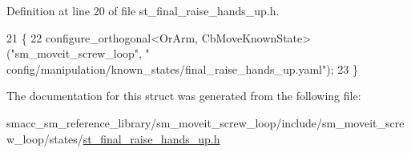 Definition at line 20 of file st\+\_\+final\+\_\+raise\+\_\+hands\+\_\+up.\+h.


\begin{DoxyCode}
21     \{
22         configure\_orthogonal<OrArm, CbMoveKnownState>(\textcolor{stringliteral}{"sm\_moveit\_screw\_loop"}, \textcolor{stringliteral}{"
      config/manipulation/known\_states/final\_raise\_hands\_up.yaml"});
23     \}
\end{DoxyCode}


The documentation for this struct was generated from the following file\+:\begin{DoxyCompactItemize}
\item 
smacc\+\_\+sm\+\_\+reference\+\_\+library/sm\+\_\+moveit\+\_\+screw\+\_\+loop/include/sm\+\_\+moveit\+\_\+screw\+\_\+loop/states/\hyperlink{sm__moveit__screw__loop_2include_2sm__moveit__screw__loop_2states_2st__final__raise__hands__up_8h}{st\+\_\+final\+\_\+raise\+\_\+hands\+\_\+up.\+h}\end{DoxyCompactItemize}
